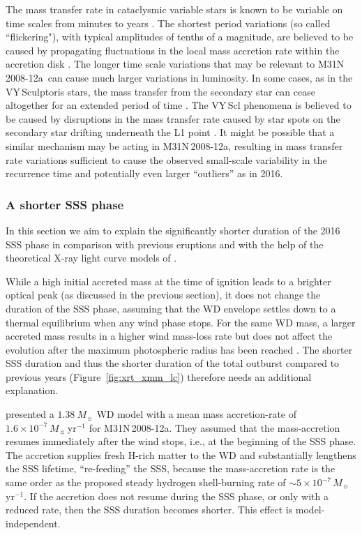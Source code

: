 \documentclass[twocolumn,tighten]{aastex6}
\def\nova{{M31N\,2008-12a~}}
\def\novak{{M31N\,2008-12a}}
\begin{document}
The mass transfer rate in cataclysmic variable stars is known to be variable on time scales from minutes to years \citep[e.g.,][and references therein]{1995cvs..book.....W}. The shortest period variations (so called ``flickering"), with typical amplitudes of tenths of a magnitude, are believed to be caused by propagating fluctuations in the local mass accretion rate within the accretion disk \citep{2014MNRAS.438.1233S}. The longer time scale variations that may be relevant to \nova can cause much larger variations in luminosity. In some cases, as in the VY\,Sculptoris stars, the mass transfer from the secondary star can cease altogether for an extended period of time \citep[e.g.,][]{1981ApJ...251..611R,1985ApJ...290..707S}. The VY\,Scl phenomena is believed to be caused by disruptions in the mass transfer rate caused by star spots on the secondary star drifting underneath the L1 point \citep[e.g.,][]{1994ApJ...427..956L,1998ApJ...499..348K, 2004AJ....128.1279H}. It might be possible that a similar mechanism may be acting in \novak, resulting in mass transfer rate variations sufficient to cause the observed small-scale variability in the recurrence time and potentially even larger ``outliers'' as in 2016.

\subsubsection{A shorter SSS phase}
\label{sec:disc_sss}
In this section we aim to explain the significantly shorter duration of the 2016 SSS phase in comparison with previous eruptions and with the help of the theoretical X-ray light curve models of \citet{2017ApJ...838..153K}.

While a high initial accreted mass at the time of ignition leads to a brighter optical peak (as discussed in the previous section), it does not change the duration of the SSS phase, assuming that the WD envelope settles down to a thermal equilibrium when any wind phase stops. For the same WD mass, a larger accreted mass results in a higher wind mass-loss rate but does not affect the evolution after the maximum photospheric radius has been reached \citep[e.g.,][]{2006ApJS..167...59H}. The shorter SSS duration and thus the shorter duration of the total outburst compared to previous years (Figure~\ref{fig:xrt_xmm_lc}) therefore needs an additional explanation.

\citet{2017ApJ...838..153K} presented a $1.38~M_\sun$ WD model with a mean mass accretion-rate of $1.6\times 10^{-7}\,M_\sun$\,yr$^{-1}$ for \novak. They assumed that the mass-accretion resumes immediately after the wind stops, i.e., at the beginning of the SSS phase. The accretion supplies fresh H-rich matter to the WD and substantially lengthens the SSS lifetime, ``re-feeding'' the SSS, because the mass-accretion rate is the same order as the proposed steady hydrogen shell-burning rate of $\sim 5 \times 10^{-7}\,M_\sun$\,yr$^{-1}$.  If the accretion does not resume during the SSS phase, or only with a reduced rate, then the SSS duration becomes shorter. This effect is model-independent.
\end{document}
